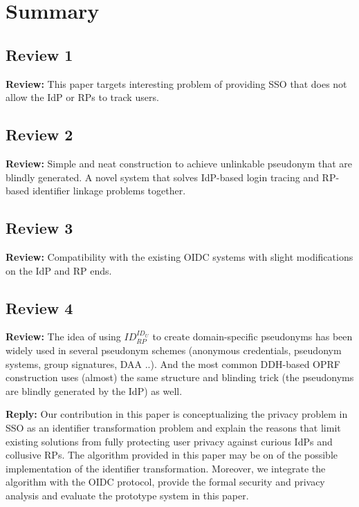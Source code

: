 \documentclass[letterpaper,onecolumn,10pt]{article}
\begin{document}
\section*{Summary}


\subsection*{Review 1}
\vspace{1mm}\noindent\textbf{Review:}
This paper targets interesting problem of providing SSO that does not allow the IdP or RPs to track users.


\subsection*{Review 2}
\vspace{1mm}\noindent\textbf{Review:}
Simple and neat construction to achieve unlinkable pseudonym that are blindly generated.
A novel system that solves IdP-based login tracing and RP-based identifier linkage problems together.

\subsection*{Review 3}
\vspace{1mm}\noindent\textbf{Review:}
Compatibility with the existing OIDC systems with slight modifications on the IdP and RP ends.

\subsection*{Review 4}
\vspace{1mm}\noindent\textbf{Review:}
The idea of using $ID_{RP}^{ID_U}$ to create domain-specific pseudonyms has been widely used in several pseudonym schemes (anonymous credentials, pseudonym systems, group signatures, DAA ..). And the most common DDH-based OPRF construction uses (almost) the same structure and blinding trick (the pseudonyms are blindly generated by the IdP) as well.

\vspace{1mm}\noindent\textbf{Reply:}
Our contribution in this paper is conceptualizing the
privacy problem in SSO as an identifier transformation problem and explain the reasons that limit existing solutions from fully protecting user privacy against curious IdPs and collusive RPs. 
The algorithm provided in this paper may be on of the possible implementation of the identifier transformation.
Moreover, we integrate the algorithm with the OIDC protocol, provide the formal security and privacy analysis and evaluate the prototype system in this paper. 
\end{document}

